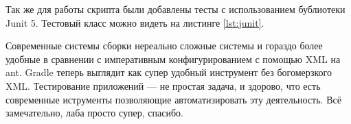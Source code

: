 

Так же для работы скрипта были добавлены тесты с использованием бублиотеки Junit 5. Тестовый класс можно видеть на листинге \ref{lst:junit}.


Современные системы сборки нереально сложные системы и гораздо более удобные в сравнении с императивным конфигурированием с помощью XML на ant. Gradle теперь выглядит как супер удобный инструмент без богомерзкого XML. Тестирование приложений --- не простая задача, и здорово, что есть современные иструменты позволяющие автоматизировать эту деятельность.
Всё замечательно, лаба просто супер, спасибо.
\newpage



